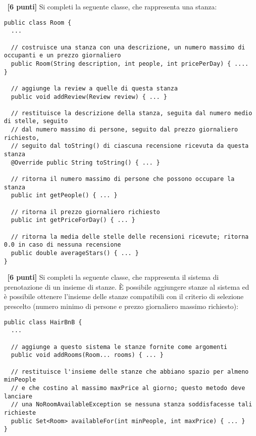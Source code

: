 \documentclass{article}[10pt]
\newcounter{esnu}
\newenvironment{esercizio}{\medskip \noindent {\bf Esercizio\addtocounter{esnu}{1} \arabic{esnu}}}{}
\begin{document}
\begin{esercizio}~\textbf{[6 punti]}
Si completi la seguente classe, che rappresenta una stanza:
%
\begin{lstlisting}
public class Room {
  ...

  // costruisce una stanza con una descrizione, un numero massimo di occupanti e un prezzo giornaliero
  public Room(String description, int people, int pricePerDay) { .... }

  // aggiunge la review a quelle di questa stanza
  public void addReview(Review review) { ... }

  // restituisce la descrizione della stanza, seguita dal numero medio di stelle, seguito
  // dal numero massimo di persone, seguito dal prezzo giornaliero richiesto,
  // seguito dal toString() di ciascuna recensione ricevuta da questa stanza
  @Override public String toString() { ... }

  // ritorna il numero massimo di persone che possono occupare la stanza
  public int getPeople() { ... }

  // ritorna il prezzo giornaliero richiesto
  public int getPriceForDay() { ... }

  // ritorna la media delle stelle delle recensioni ricevute; ritorna 0.0 in caso di nessuna recensione
  public double averageStars() { ... }
}
\end{lstlisting}
\end{esercizio}

\begin{esercizio}~\textbf{[6 punti]}
Si completi la seguente classe, che rappresenta il sistema di prenotazione di
un insieme di stanze. \`E possibile aggiungere stanze al sistema ed \`e possibile
ottenere l'insieme delle stanze compatibili con il criterio di selezione prescelto
(numero minimo di persone e prezzo giornaliero massimo richiesto):
%
\begin{lstlisting}
public class HairBnB {
  ...

  // aggiunge a questo sistema le stanze fornite come argomenti
  public void addRooms(Room... rooms) { ... }

  // restituisce l'insieme delle stanze che abbiano spazio per almeno minPeople
  // e che costino al massimo maxPrice al giorno; questo metodo deve lanciare
  // una NoRoomAvailableException se nessuna stanza soddisfacesse tali richieste
  public Set<Room> availableFor(int minPeople, int maxPrice) { ... }
}
\end{lstlisting}
\end{esercizio}
\end{document}
